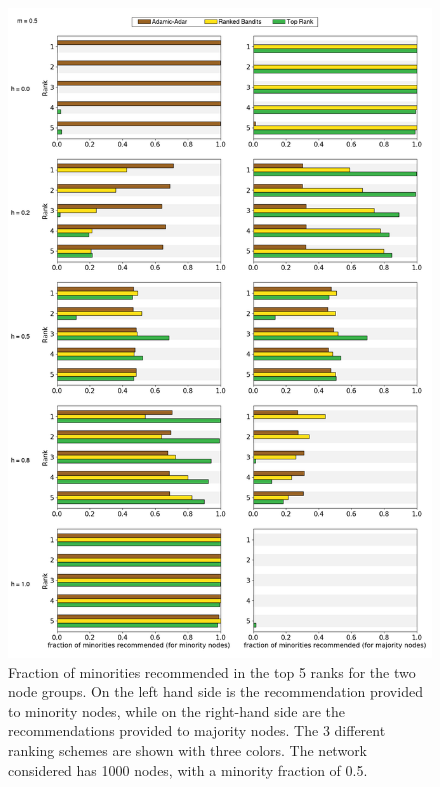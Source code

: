 \begin{figure}
	\includegraphics[scale=0.28]{images/proposal_figure_3_6}
	\caption{Fraction of minorities recommended in the top 5 ranks for the two node groups. On the left hand side is the recommendation provided to minority nodes, while on the right-hand side are the recommendations provided to majority nodes. The 3 different ranking schemes are shown with three colors. The network considered has 1000 nodes, with a minority fraction of 0.5.}
	\label{fig-rank_6}
\end{figure}

